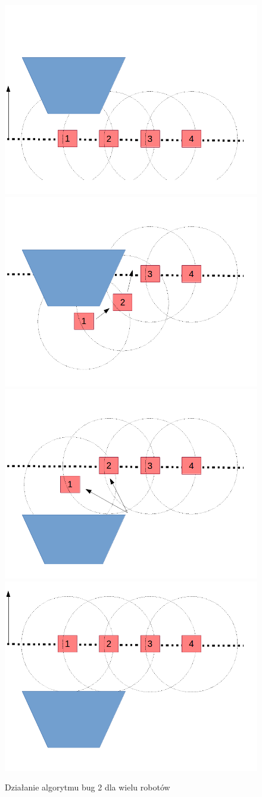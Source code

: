 \documentclass[a4paper, 12pt]{article}
\begin{document}
	\begin{figure}[h!]
		\includegraphics*[width=0.5\columnwidth]{img/przeszkoda/1.png}
		\includegraphics*[width=0.5\columnwidth]{img/przeszkoda/2.png}
		\includegraphics*[width=0.5\columnwidth]{img/przeszkoda/3.png}
		\includegraphics*[width=0.5\columnwidth]{img/przeszkoda/4.png}
		\caption{Działanie algorytmu bug 2 dla wielu robotów}
		\label{omijanie}
	\end{figure}
	\clearpage
\end{document}
